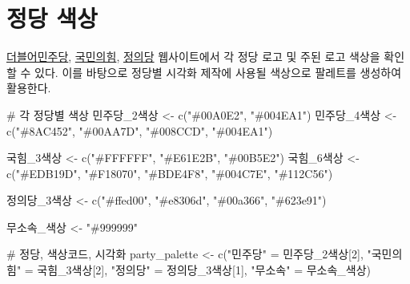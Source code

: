 \documentclass[
  letterpaper,
]{book}
\newenvironment{Shaded}{\begin{snugshade}}{\end{snugshade}}
\newcommand{\CommentTok}[1]{\textcolor[rgb]{0.37,0.37,0.37}{#1}}
\newcommand{\DecValTok}[1]{\textcolor[rgb]{0.68,0.00,0.00}{#1}}
\newcommand{\FunctionTok}[1]{\textcolor[rgb]{0.28,0.35,0.67}{#1}}
\newcommand{\NormalTok}[1]{\textcolor[rgb]{0.00,0.23,0.31}{#1}}
\newcommand{\OtherTok}[1]{\textcolor[rgb]{0.00,0.23,0.31}{#1}}
\newcommand{\StringTok}[1]{\textcolor[rgb]{0.13,0.47,0.30}{#1}}
\begin{document}
\hypertarget{uxc815uxb2f9-uxc0c9uxc0c1}{%
\section{정당 색상}\label{uxc815uxb2f9-uxc0c9uxc0c1}}

\href{https://www.peoplepowerparty.kr/about/logo}{더블어민주당},
\href{https://www.peoplepowerparty.kr/about/logo}{국민의힘},
\href{https://www.justice21.org/newhome/about/info021.html}{정의당}
웹사이트에서 각 정당 로고 및 주된 로고 색상을 확인할 수 있다. 이를
바탕으로 정당별 시각화 제작에 사용될 색상으로 팔레트를 생성하여
활용한다.

\begin{Shaded}
\begin{Highlighting}[]
\CommentTok{\# 각 정당별 색상}
\NormalTok{민주당\_2색상 }\OtherTok{\textless{}{-}} \FunctionTok{c}\NormalTok{(}\StringTok{"\#00A0E2"}\NormalTok{, }\StringTok{"\#004EA1"}\NormalTok{)}
\NormalTok{민주당\_4색상 }\OtherTok{\textless{}{-}} \FunctionTok{c}\NormalTok{(}\StringTok{"\#8AC452"}\NormalTok{, }\StringTok{"\#00AA7D"}\NormalTok{, }\StringTok{"\#008CCD"}\NormalTok{, }\StringTok{"\#004EA1"}\NormalTok{)}

\NormalTok{국힘\_3색상 }\OtherTok{\textless{}{-}} \FunctionTok{c}\NormalTok{(}\StringTok{"\#FFFFFF"}\NormalTok{, }\StringTok{"\#E61E2B"}\NormalTok{, }\StringTok{"\#00B5E2"}\NormalTok{)}
\NormalTok{국힘\_6색상 }\OtherTok{\textless{}{-}} \FunctionTok{c}\NormalTok{(}\StringTok{"\#EDB19D"}\NormalTok{, }\StringTok{"\#F18070"}\NormalTok{, }\StringTok{"\#BDE4F8"}\NormalTok{, }\StringTok{"\#004C7E"}\NormalTok{, }\StringTok{"\#112C56"}\NormalTok{)}

\NormalTok{정의당\_3색상 }\OtherTok{\textless{}{-}} \FunctionTok{c}\NormalTok{(}\StringTok{"\#ffed00"}\NormalTok{, }\StringTok{"\#e8306d"}\NormalTok{, }\StringTok{"\#00a366"}\NormalTok{, }\StringTok{"\#623e91"}\NormalTok{)}

\NormalTok{무소속\_색상 }\OtherTok{\textless{}{-}} \StringTok{"\#999999"}

\CommentTok{\# 정당, 색상코드, 시각화}
\NormalTok{party\_palette }\OtherTok{\textless{}{-}} \FunctionTok{c}\NormalTok{(}\StringTok{"민주당"} \OtherTok{=}\NormalTok{ 민주당\_2색상[}\DecValTok{2}\NormalTok{], }
                   \StringTok{"국민의힘"} \OtherTok{=}\NormalTok{ 국힘\_3색상[}\DecValTok{2}\NormalTok{], }
                   \StringTok{"정의당"} \OtherTok{=}\NormalTok{ 정의당\_3색상[}\DecValTok{1}\NormalTok{], }
                   \StringTok{"무소속"} \OtherTok{=}\NormalTok{ 무소속\_색상)}


\end{Highlighting}
\end{Shaded}
\end{document}

